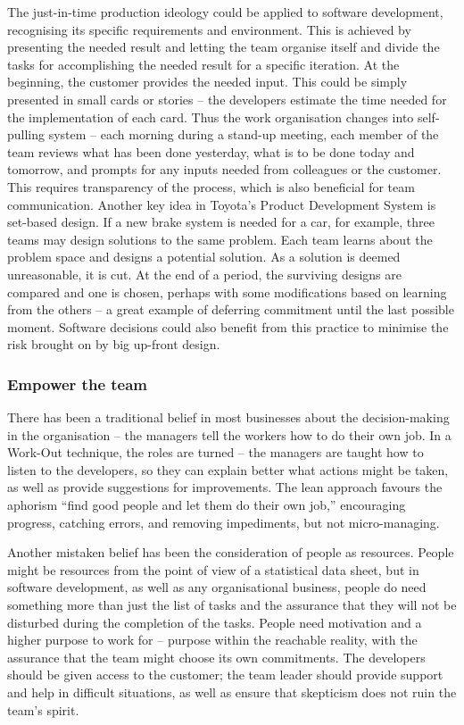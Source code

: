 The just-in-time production ideology could be applied to software development, recognising its specific requirements and environment. This is achieved by presenting the needed result and letting the team organise itself and divide the tasks for accomplishing the needed result for a specific iteration. At the beginning, the customer provides the needed input. This could be simply presented in small cards or stories -- the developers estimate the time needed for the implementation of each card. Thus the work organisation changes into self-pulling system -- each morning during a stand-up meeting, each member of the team reviews what has been done yesterday, what is to be done today and tomorrow, and prompts for any inputs needed from colleagues or the customer. This requires transparency of the process, which is also beneficial for team communication. Another key idea in Toyota's Product Development System is set-based design. If a new brake system is needed for a car, for example, three teams may design solutions to the same problem. Each team learns about the problem space and designs a potential solution. As a solution is deemed unreasonable, it is cut. At the end of a period, the surviving designs are compared and one is chosen, perhaps with some modifications based on learning from the others -- a great example of deferring commitment until the last possible moment. Software decisions could also benefit from this practice to minimise the risk brought on by big up-front design.

\subsubsection{Empower the team}

There has been a traditional belief in most businesses about the decision-making in the organisation -- the managers tell the workers how to do their own job. In a Work-Out technique, the roles are turned -- the managers are taught how to listen to the developers, so they can explain better what actions might be taken, as well as provide suggestions for improvements. The lean approach favours the aphorism ``find good people and let them do their own job,'' encouraging progress, catching errors, and removing impediments, but not micro-managing.

Another mistaken belief has been the consideration of people as resources. People might be resources from the point of view of a statistical data sheet, but in software development, as well as any organisational business, people do need something more than just the list of tasks and the assurance that they will not be disturbed during the completion of the tasks. People need motivation and a higher purpose to work for -- purpose within the reachable reality, with the assurance that the team might choose its own commitments. The developers should be given access to the customer; the team leader should provide support and help in difficult situations, as well as ensure that skepticism does not ruin the team’s spirit.

